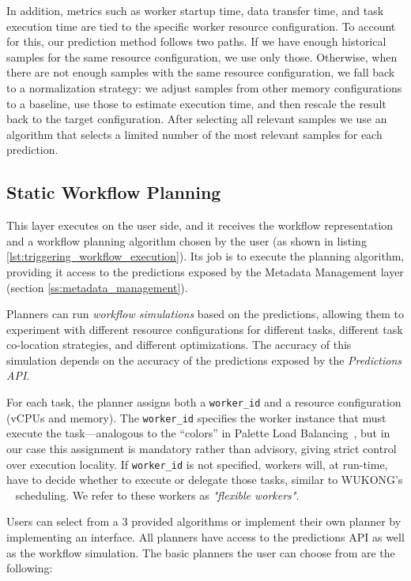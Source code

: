 \documentclass[conference]{IEEEtran}
\begin{document}
In addition, metrics such as worker startup time, data transfer time, and task execution time are tied to the specific worker resource configuration. To account for this, our prediction method follows two paths. If we have enough historical samples for the same resource configuration, we use only those. Otherwise, when there are not enough samples with the same resource configuration, we fall back to a normalization strategy: we adjust samples from other memory configurations to a baseline, use those to estimate execution time, and then rescale the result back to the target configuration. After selecting all relevant samples we use an algorithm that selects a limited number of the most relevant samples for each prediction.

\subsection{Static Workflow Planning}
This layer executes on the user side, and it receives the workflow representation and a workflow planning algorithm chosen by the user (as shown in listing \ref{lst:triggering_workflow_execution}). Its job is to execute the planning algorithm, providing it access to the predictions exposed by the Metadata Management layer (section \ref{ss:metadata_management}).

Planners can run \textit{workflow simulations} based on the predictions, allowing them to experiment with different resource configurations for different tasks, different task co-location strategies, and different optimizations. The accuracy of this simulation depends on the accuracy of the predictions exposed by the \textit{Predictions API}.

For each task, the planner assigns both a \texttt{worker\_id} and a resource configuration (vCPUs and memory). The \texttt{worker\_id} specifies the worker instance that must execute the task—analogous to the “colors” in Palette Load Balancing~\cite{palette_load_balancing}, but in our case this assignment is mandatory rather than advisory, giving strict control over execution locality. If \texttt{worker\_id} is not specified, workers will, at run-time, have to decide whether to execute or delegate those tasks, similar to WUKONG's ~\cite{wukong_2} scheduling. We refer to these workers as \textit{"flexible workers"}.

Users can select from a 3 provided algorithms or implement their own planner by implementing an interface. All planners have access to the predictions API as well as the workflow simulation. The basic planners the user can choose from are the following:
\end{document}
